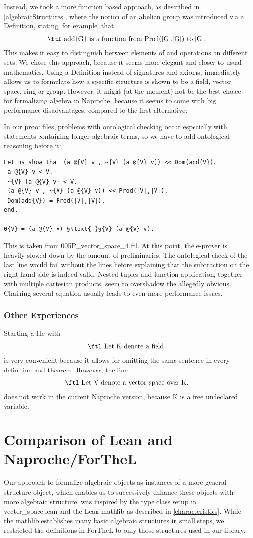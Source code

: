 \documentclass[11pt]{article}
\begin{document}
Instead, we took a more function based approach, as described in \ref{algebraicStructures}, where the notion of an abelian group was introduced via a {\ftl Definition}, stating, for example, that
$$\text{\ftl add\{G\} is a function from Prod(|G|,|G|) to |G|.}$$
This makes it easy to distinguish between elements of and operations on different sets.
We chose this approach, because it seems more elegant and closer to usual mathematics. Using a {\ftl Definition} instead of signatures and axioms, immediately allows us to formulate how a specific structure is shown to be a field, vector space, ring or group.
However, it might (at the moment) not be the best choice for formalizing algebra in Naproche, because it seems to come with big performance disadvantages, compared to the first alternative:

In our proof files, problems with ontological checking occur especially with statements containing longer algebraic terms, so we have to add ontological reasoning before it:
\begin{lstlisting}
Let us show that (a @{V} v , ~{V} (a @{V} v)) << Dom(add{V}).
 a @{V} v < V.
 ~{V} (a @{V} v) < V.
 (a @{V} v , ~{V} (a @{V} v)) << Prod(|V|,|V|).
 Dom(add{V}) = Prod(|V|,|V|).
end.

0{V} = (a @{V} v) §\text{-}§{V} (a @{V} v).
\end{lstlisting}
This is taken from 005P\_vector\_space\_4.ftl. At this point, the e-prover is heavily slowed down by the amount of preliminaries. The ontological check of the last line would fail without the lines before explaining that the subtraction on the right-hand side is indeed valid. Nested tuples and function application, together with multiple cartesian products, seem to overshadow the allegedly obvious. Chaining several equation usually leads to even more performance issues.

\subsubsection{Other Experiences}
Starting a file with
$$\text{\ftl Let K denote a field.}$$
is very convenient because it allows for omitting the same sentence in every definition and theorem.
However, the line
$$\text{\ftl Let V denote a vector space over K.}$$
does not work in the current Naproche version, because {\ftl K} is a free undeclared variable.

\newpage
\section{Comparison of Lean and Naproche/ForTheL}
Our approach to formalize algebraic objects as instances of a more general {\ftl structure} object, which enables us to successively enhance these objects with more algebraic structure, was inspired by the type class setup in vector\_space.lean and the Lean mathlib as described in \ref{characteristics}.
While the mathlib establishes many basic algebraic structures in small steps, we restricted the definitions in ForTheL to only those structures used in our library.
\end{document}
